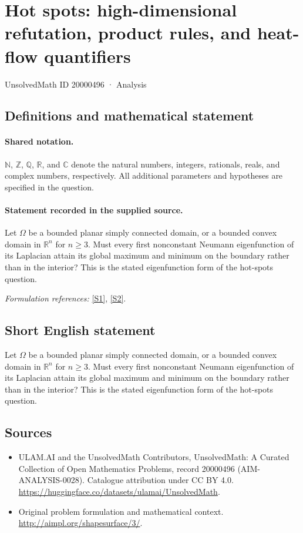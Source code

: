 \documentclass[11pt]{article}
\newcommand{\sref}[2]{\hyperlink{source:#1:#2}{[S#2]}}
\begin{document}
\setcounter{section}{20000495}
\section{Hot spots: high-dimensional refutation, product rules, and heat-flow quantifiers}\label{20000496}
{\small UnsolvedMath ID 20000496 · Analysis}
\subsection{Definitions and mathematical statement}

\paragraph{Shared notation.}$\mathbb N$, $\mathbb Z$, $\mathbb Q$, $\mathbb R$, and $\mathbb C$ denote the natural numbers, integers, rationals, reals, and complex numbers, respectively. All additional parameters and hypotheses are specified in the question.


\paragraph{Statement recorded in the supplied source.}
Let $\Omega$ be a bounded planar simply connected domain, or a bounded convex domain in $\mathbb R^n$ for $n\geq3$. Must every first nonconstant Neumann eigenfunction of its Laplacian attain its global maximum and minimum on the boundary rather than in the interior? This is the stated eigenfunction form of the hot-spots question.
\par\smallskip\textit{Formulation references:} \sref{20000496}{1}, \sref{20000496}{2}.
\subsection{Short English statement}
Let $\Omega$ be a bounded planar simply connected domain, or a bounded convex domain in $\mathbb R^n$ for $n\geq3$. Must every first nonconstant Neumann eigenfunction of its Laplacian attain its global maximum and minimum on the boundary rather than in the interior? This is the stated eigenfunction form of the hot-spots question.
\subsection{Sources}
\begin{itemize}
\item[\hypertarget{source:20000496:1}{S1}] ULAM.AI and the UnsolvedMath Contributors, UnsolvedMath: A Curated Collection of Open Mathematics Problems, record 20000496 (AIM-ANALYSIS-0028). Catalogue attribution under CC BY 4.0.
\url{https://huggingface.co/datasets/ulamai/UnsolvedMath}.
\item[\hypertarget{source:20000496:2}{S2}] Original problem formulation and mathematical context.
\url{http://aimpl.org/shapesurface/3/}.
\end{itemize}
\label{end:20000496}
\end{document}
